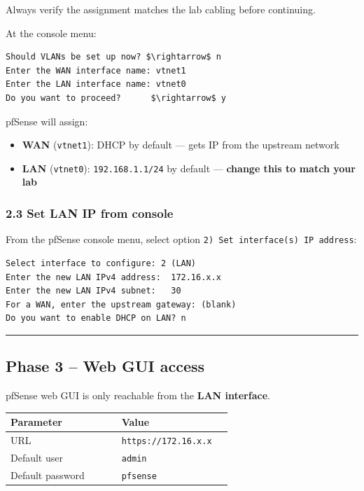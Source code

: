 Always verify the assignment matches the lab cabling before continuing.

At the console menu:

\begin{lstlisting}
Should VLANs be set up now? $\rightarrow$ n
Enter the WAN interface name: vtnet1
Enter the LAN interface name: vtnet0
Do you want to proceed?      $\rightarrow$ y
\end{lstlisting}

pfSense will assign:

\begin{itemize}
\tightlist
\item
  \textbf{WAN} (\texttt{vtnet1}): DHCP by default --- gets IP from the upstream network
\item
  \textbf{LAN} (\texttt{vtnet0}): \texttt{192.168.1.1/24} by default --- \textbf{change this to match your lab}
\end{itemize}

\subsubsection{2.3 Set LAN IP from console}

From the pfSense console menu, select option \texttt{2)\ Set\ interface(s)\ IP\ address}:

\begin{lstlisting}
Select interface to configure: 2 (LAN)
Enter the new LAN IPv4 address:  172.16.x.x
Enter the new LAN IPv4 subnet:   30
For a WAN, enter the upstream gateway: (blank)
Do you want to enable DHCP on LAN? n
\end{lstlisting}

\begin{center}\rule{0.5\linewidth}{0.5pt}\end{center}

\subsection{Phase 3 -- Web GUI access}

pfSense web GUI is only reachable from the \textbf{LAN interface}.

{\footnotesize\begin{longtable}[]{@{}>{\raggedright\arraybackslash}p{0.45\linewidth}
  >{\raggedright\arraybackslash}p{0.45\linewidth}@{}}
\toprule\noalign{}
Parameter & Value \\
\midrule\noalign{}
\endhead
\bottomrule\noalign{}
\endlastfoot
URL & \texttt{https://172.16.x.x} \\
Default user & \texttt{admin} \\
Default password & \texttt{pfsense} \\
\end{longtable}}

